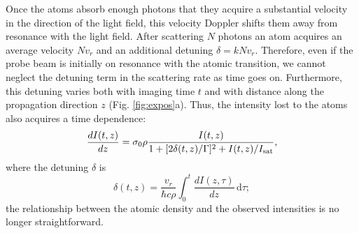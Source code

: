\documentclass[12pt]{iopart}
\begin{document}
\par Once the atoms absorb enough photons that they acquire a substantial velocity in the direction of the light field, this velocity Doppler shifts them away from resonance with the light field. After scattering $N$ photons an atom acquires an average velocity $N v_r$ and an additional detuning $\delta=k N v_r$. Therefore, even if the probe beam is initially on resonance with the atomic transition, we cannot neglect the detuning term in the scattering rate as time goes on. Furthermore, this detuning varies both with imaging time $t$ and with distance along the propagation direction $z$ (Fig. \ref{fig:expos}a). Thus, the intensity lost to the atoms also acquires a time dependence: 
\begin{equation}
\frac{dI(t,z)}{dz}=\sigma_0 \rho \frac{I(t,z)}{1+[2\delta(t,z)/\Gamma]^2 +I(t,z)/I_{\rm{sat}}}, \label{eq3}
\end{equation}
where the detuning $\delta$ is
\begin{equation}
\delta(t,z)=\frac{v_r}{\hbar c \rho}\int_0^t \frac{dI(z,\tau)}{dz}\,\mathrm{d}\tau; \label{eq4} 
\end{equation}
the relationship between the atomic density and the observed intensities is no longer straightforward.
\end{document}
